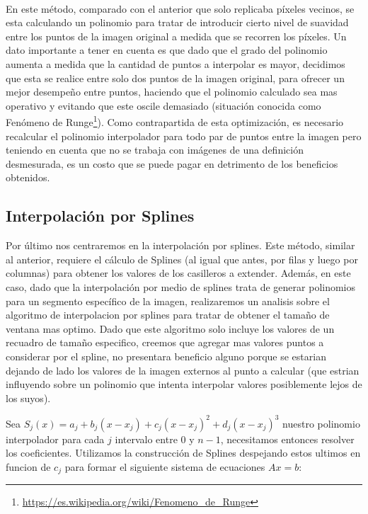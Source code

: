 \\
En este método, comparado con el anterior que solo replicaba píxeles vecinos, se esta calculando un polinomio para tratar de introducir cierto nivel de suavidad entre los puntos de la imagen original a medida que se recorren los píxeles. Un dato importante a tener en cuenta es que dado que el grado del polinomio aumenta a medida que la cantidad de puntos a interpolar es mayor, decidimos que esta se realice entre solo dos puntos de la imagen original, para ofrecer un mejor desempe\~no entre puntos, haciendo que el polinomio calculado sea mas operativo y evitando que este oscile demasiado (situación conocida como Fenómeno de Runge\footnote{\url{https://es.wikipedia.org/wiki/Fenomeno_de_Runge}}). Como contrapartida de esta optimización, es necesario recalcular el polinomio interpolador para todo par de puntos entre la imagen pero teniendo en cuenta que no se trabaja con imágenes de una definición desmesurada, es un costo que se puede pagar en detrimento de los beneficios obtenidos.


\subsection{Interpolación por Splines}
Por último nos centraremos en la interpolación por splines. Este método, similar al anterior, requiere el cálculo de Splines (al igual que antes, por filas y luego por columnas) para obtener los valores de los casilleros a extender.
Además, en este caso, dado que la interpolación por medio de splines trata de generar polinomios para un segmento
específico de la imagen, realizaremos un analisis sobre el algoritmo de interpolacion por splines para tratar de obtener el tamaño de ventana mas optimo. Dado que este algoritmo solo incluye los valores de un recuadro de tamaño especifico, creemos que agregar mas valores puntos a considerar por el spline, no presentara beneficio alguno porque se estarian dejando de lado los valores de la imagen externos al punto a calcular (que estrian influyendo sobre un polinomio que intenta interpolar valores posiblemente lejos de los suyos).

Sea $S_{j}(x) = a_{j} + b_{j}(x - x_{j}) + c_{j}(x - x_{j})^2 + d_{j}(x - x_{j})^3$ nuestro polinomio interpolador para cada $j$ intervalo entre $0$ y $n-1$, necesitamos entonces resolver los coeficientes. Utilizamos la construcción de Splines despejando estos ultimos en funcion de $c_{j}$ para formar el siguiente sistema de ecuaciones $Ax = b$:

